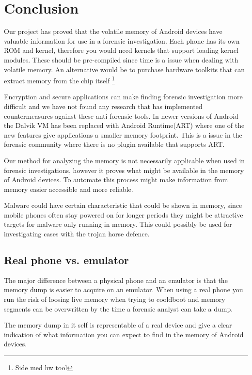 \section{Conclusion}
Our project has proved that the volatile memory of Android devices have valuable information for use 
in a forensic investigation. %
Each phone has its own ROM and kernel, therefore you would need kernels that support loading kernel 
modules. These should be pre-compiled since time is a issue when dealing with volatile memory. An 
alternative would be to purchase hardware toolkits that can extract memory from the chip itself 
\footnote{Side med hw tool} %

Encryption and secure applications can make finding forensic investigation more difficult and we have not found 
any research that has implemented countermeasures against these anti-forensic tools. In newer versions 
of Android the Dalvik VM has been replaced with Android Runtime(ART) where one of the new 
features give applications a smaller memory footprint. This is a issue in the forensic community where there is no 
plugin available that supports ART.

Our method for analyzing the memory is not necessarily applicable when used in forensic investigations, 
however it proves what might be available in the memory of Android devices. 
To automate this process might make information from memory easier accessible and more reliable.

Malware could have certain characteristic that could be shown in memory, since mobile phones often stay 
powered on for longer periods they might be attractive targets for malware only running in memory. 
This could possibly be used for investigating cases with the trojan horse defence.

\subsection{Real phone vs. emulator}
The major difference between a physical phone and an emulator is that the memory dump is easier to acquire on an emulator. When using a real phone you run the risk of loosing live memory when trying to cooldboot and 
memory segments can be overwritten by the time a forensic analyst can take a dump.

The memory dump in it self is representable of a real device and give a clear indication of what 
information you can expect to find in the memory of Android devices.




